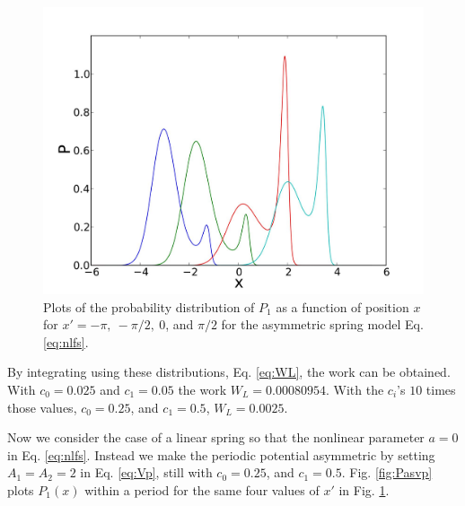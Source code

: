 \documentclass[11pt]{ucthesis}
\begin{document}
\begin{figure}[htp]
\begin{center}
\includegraphics[width=\textwidth]{Pnl_spr}
\caption{
Plots of the probability distribution of $P_1$ as a function of position $x$
for $x' = -\pi,\ -\pi/2,\ 0$, and $\pi/2$ for the asymmetric spring model Eq. \ref{eq:nlfs}.
}
\label{fig:Pnlspr}
\end{center}
\end{figure}

By integrating using these distributions, Eq. \ref{eq:WL}, the work can be
obtained.  With $c_0 = 0.025$ and $c_1 = 0.05$ the work $W_L =   0.00080954$.
With the $c_i$'s $10$ times those values, 
$c_0 = 0.25$, and $c_1 = 0.5$, $W_L =  0.0025$. 

Now we consider the case of a linear spring so that the nonlinear parameter $a=0$
in Eq. \ref{eq:nlfs}. Instead we make the periodic potential asymmetric by
setting  $A_1 = A_2 =2$ in Eq. \ref{eq:Vp}, still with
$c_0 = 0.25$, and $c_1 = 0.5$. 
Fig. \ref{fig:Pasvp} plots $P_1(x)$ within a period for the same four values of $x'$ in Fig. \ref{fig:Pnlspr}.
\end{document}

